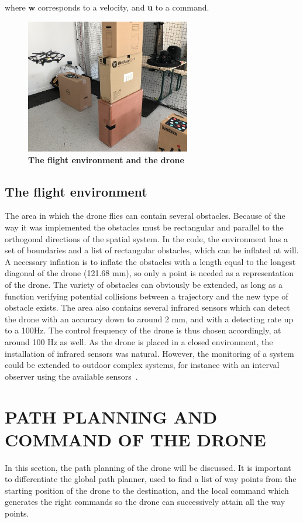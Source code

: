\documentclass[letterpaper, 10 pt, conference]{ieeeconf}  %
\begin{document}
where $\dot{\textbf{w}}$  corresponds to a velocity, and \textbf{u} to a command.\\

\begin{figure}[h!]
\centering
\includegraphics[width=7.2cm]{montage.jpg}
\caption{ \textbf{The flight environment and the drone} }
\label{fig:montage}
\end{figure}

\subsection{The flight environment}
The area in which the drone flies can contain several obstacles. Because of the way it was implemented the obstacles must be rectangular and parallel to the orthogonal directions of the spatial system. In the code, the environment has a set of boundaries and a list of rectangular obstacles, which can be inflated at will. A necessary inflation is to inflate the obstacles with a length equal to the longest diagonal of the drone (121.68 mm), so only a point is needed as a representation of the drone.  The variety of obstacles can obviously be extended, as long as a function verifying potential collisions between a trajectory and the new type of obstacle exists. The area also contains several infrared sensors which can detect the drone with an accuracy down to around 2 mm, and with a detecting rate up to a 100Hz. The control frequency of the drone is thus chosen accordingly, at around 100 Hz as well. As the drone is placed in a closed environment, the installation of infrared sensors was natural. However, the monitoring of a system could be extended to outdoor complex systems, for instance with an interval observer using the available sensors~\cite{Quadrotors Observer,observer}.

\section{PATH PLANNING AND COMMAND OF THE DRONE}
In this section, the path planning of the drone will be discussed. It is important to differentiate the global path planner, used to find a list of way points from the starting position of the drone to the destination, and the local command which generates the right commands so the drone can successively attain all the way points.
\end{document}

